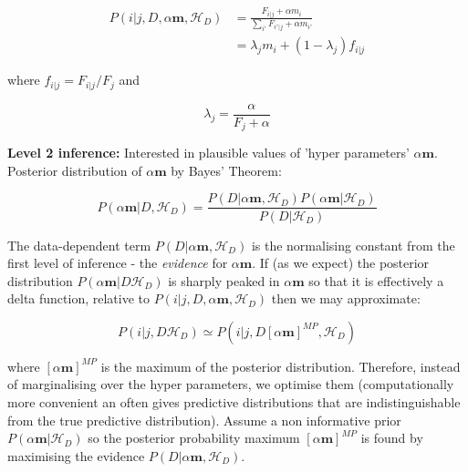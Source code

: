 \begin{align}
P(i|j, D, \alpha\boldsymbol{m}, \mathscr{H}_{D})&=\frac{F_{i|j}+\alpha m_{i}}{\sum_{i'}F_{i'|j}+\alpha m_{i'}}
\\
&= \lambda_{j}m_{i}+(1-\lambda_{j})f_{i|j}
\end{align}

\noindent where $f_{i|j}=F_{i|j}/F_{j}$ and 

\begin{equation}
\lambda_{j}=\frac{\alpha}{F_{j}+\alpha}
\end{equation}

\textbf{Level 2 inference: } Interested in plausible values of 'hyper parameters' $\alpha\boldsymbol{m}$. Posterior distribution of $\alpha\boldsymbol{m}$ by Bayes' Theorem:

\begin{equation}
P(\alpha\boldsymbol{m}|D, \mathscr{H}_{D})=\frac{P(D|\alpha\boldsymbol{m},\mathscr{H}_{D})P(\alpha\boldsymbol{m}|\mathscr{H}_{D})}{P(D|\mathscr{H}_{D})}
\end{equation}

\noindent The data-dependent term $P(D|\alpha\boldsymbol{m},\mathscr{H}_{D})$ is the normalising constant from the first level of inference - the \textit{evidence} for $\alpha\boldsymbol{m}$. If (as we expect) the posterior distribution $P(\alpha\boldsymbol{m}|D\mathscr{H}_{D})$ is sharply peaked in $\alpha\boldsymbol{m}$ so that it is effectively a delta function, relative to $P(i|j, D, \alpha\boldsymbol{m},\mathscr{H}_{D})$ then we may approximate:

\begin{equation}
P(i|j,D\mathscr{H}_{D})\simeq P(i|j,D[\alpha\boldsymbol{m}]^{MP},\mathscr{H}_{D})
\end{equation}

\noindent where $[\alpha\boldsymbol{m}]^{MP}$ is the maximum of the posterior distribution. Therefore, instead of marginalising over the hyper parameters, we optimise them (computationally more convenient an often gives predictive distributions that are indistinguishable from the true predictive distribution). Assume a non informative prior $P(\alpha\boldsymbol{m}|\mathscr{H}_{D})$ so the posterior probability maximum $[\alpha\boldsymbol{m}]^{MP}$ is found by maximising the evidence $P(D|\alpha\boldsymbol{m},\mathscr{H}_{D})$.

